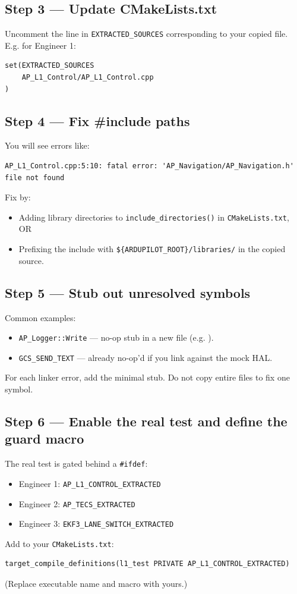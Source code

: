 \documentclass[a4paper,11pt,twoside]{article}
\begin{document}
\subsection*{Step 3 --- Update CMakeLists.txt}
Uncomment the line in \texttt{EXTRACTED\_SOURCES} corresponding to your copied file. E.g. for Engineer 1:
\begin{Verbatim}[frame=single,fontsize=\small]
set(EXTRACTED_SOURCES
    AP_L1_Control/AP_L1_Control.cpp
)
\end{Verbatim}

\subsection*{Step 4 --- Fix \#include paths}
You will see errors like:
\begin{Verbatim}[frame=single,fontsize=\small]
AP_L1_Control.cpp:5:10: fatal error: 'AP_Navigation/AP_Navigation.h' file not found
\end{Verbatim}
Fix by:
\begin{itemize}
  \item Adding library directories to \texttt{include\_directories()} in \texttt{CMakeLists.txt}, OR
  \item Prefixing the include with \texttt{\$\{ARDUPILOT\_ROOT\}/libraries/} in the copied source.
\end{itemize}

\subsection*{Step 5 --- Stub out unresolved symbols}
Common examples:
\begin{itemize}
  \item \texttt{AP\_Logger::Write} --- no-op stub in a new file (e.g. ).
  \item \texttt{GCS\_SEND\_TEXT} --- already no-op'd if you link against the mock HAL.
\end{itemize}
For each linker error, add the minimal stub. Do not copy entire files to fix one symbol.

\subsection*{Step 6 --- Enable the real test and define the guard macro}
The real test is gated behind a \texttt{\#ifdef}:
\begin{itemize}
  \item Engineer 1: \texttt{AP\_L1\_CONTROL\_EXTRACTED}
  \item Engineer 2: \texttt{AP\_TECS\_EXTRACTED}
  \item Engineer 3: \texttt{EKF3\_LANE\_SWITCH\_EXTRACTED}
\end{itemize}
Add to your \texttt{CMakeLists.txt}:
\begin{Verbatim}[frame=single,fontsize=\small]
target_compile_definitions(l1_test PRIVATE AP_L1_CONTROL_EXTRACTED)
\end{Verbatim}
(Replace executable name and macro with yours.)
\end{document}
